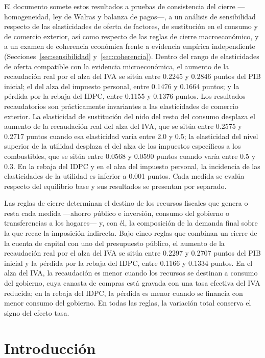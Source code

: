\documentclass[11pt]{article}
\begin{document}
El documento somete estos resultados a pruebas de consistencia del cierre ---homogeneidad, ley de Walras y balanza de pagos---, a un análisis de sensibilidad respecto de las elasticidades de oferta de factores, de sustitución en el consumo y de comercio exterior, así como respecto de las reglas de cierre macroeconómico, y a un examen de coherencia económica frente a evidencia empírica independiente (Secciones~\ref{sec:sensibilidad} y~\ref{sec:coherencia}). Dentro del rango de elasticidades de oferta compatible con la evidencia microeconómica, el aumento de la recaudación real por el alza del IVA se sitúa entre 0.2245 y 0.2846 puntos del PIB inicial; el del alza del impuesto personal, entre 0.1476 y 0.1664 puntos; y la pérdida por la rebaja del IDPC, entre 0.1155 y 0.1376 puntos. Los resultados recaudatorios son prácticamente invariantes a las elasticidades de comercio exterior. La elasticidad de sustitución del nido del resto del consumo desplaza el aumento de la recaudación real del alza del IVA, que se sitúa entre 0.2575 y 0.2717 puntos cuando esa elasticidad varía entre 2.0 y 0.5; la elasticidad del nivel superior de la utilidad desplaza el del alza de los impuestos específicos a los combustibles, que se sitúa entre 0.0568 y 0.0590 puntos cuando varía entre 0.5 y 0.3. En la rebaja del IDPC y en el alza del impuesto personal, la incidencia de las elasticidades de la utilidad es inferior a 0.001 puntos. Cada medida se evalúa respecto del equilibrio base y sus resultados se presentan por separado.

Las reglas de cierre determinan el destino de los recursos fiscales que genera o resta cada medida ---ahorro público e inversión, consumo del gobierno o transferencias a los hogares--- y, con él, la composición de la demanda final sobre la que recae la imposición indirecta. Bajo cinco reglas que combinan un cierre de la cuenta de capital con uno del presupuesto público, el aumento de la recaudación real por el alza del IVA se sitúa entre 0.2297 y 0.2707 puntos del PIB inicial y la pérdida por la rebaja del IDPC, entre 0.1166 y 0.1334 puntos. En el alza del IVA, la recaudación es menor cuando los recursos se destinan a consumo del gobierno, cuya canasta de compras está gravada con una tasa efectiva del IVA reducida; en la rebaja del IDPC, la pérdida es menor cuando se financia con menor consumo del gobierno. En todas las reglas, la variación total conserva el signo del efecto tasa.

\section{Introducción}
\end{document}
